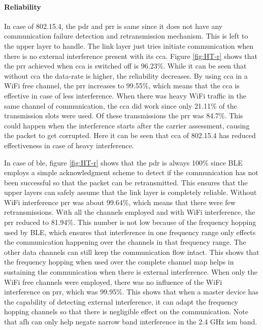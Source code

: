 \paragraph{Reliability}
In case of 802.15.4, the \gls{pdr} and \gls{prr} is same since it does not have any communication failure detection and retransmission mechanism. This is left to the upper layer to handle. The link layer just tries initiate communication when there is no external interference present with its \gls{cca}. Figure \ref{fig:HT-r} shows that the \gls{prr} achieved when \gls{cca} is switched off is 96.23\%. While it can be seen that without \gls{cca} the data-rate is higher, the reliability decreases. By using \gls{cca} in a WiFi free channel, the \gls{prr} increases to 99.55\%, which means that the \gls{cca} is effective in case of less interference. When there was heavy WiFi traffic in the same channel of communication, the \gls{cca} did work since only 21.11\% of the transmission slots were used. Of these transmissions the \gls{prr} was 84.7\%. This could happen when the interference starts after the carrier assessment, causing the packet to get corrupted. Here it can be seen that \gls{cca} of 802.15.4 has reduced effectiveness in case of heavy interference.

In case of \gls{ble}, figure \ref{fig:HT-r} shows that the \gls{pdr} is always 100\% since BLE employs a simple acknowledgment scheme to detect if the communication has not been successful so that the packet can be retransmitted. This ensures that the upper layers can safely assume that the link layer is completely reliable. Without WiFi interference \gls{prr} was about 99.64\%, which means that there were few retransmissions. With all the channels employed and with WiFi interference, the \gls{prr} reduced to 81.94\%. This number is not low because of the frequency hopping used by BLE, which ensures that interference in one frequency range only effects the communication happening over the channels in that frequency range. The other data channels can still keep the communication flow intact. This shows that the frequency hopping when used over the complete channel map helps in sustaining the communication when there is external interference. When only the WiFi free channels were employed, there was no influence of the WiFi interference on \gls{prr}, which was 99.95\%. This shows that when a master device has the capability of detecting external interference, it can adapt the frequency hopping channels so that there is negligible effect on the communication. Note that \gls{afh} can only help negate narrow band interference in the 2.4 GHz \gls{ism} band.

